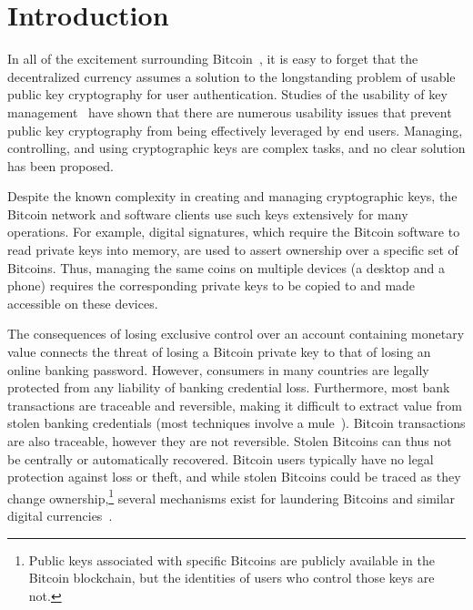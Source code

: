 

\section{Introduction}
In all of the excitement surrounding Bitcoin~\cite{Nak08}, it is easy to forget that the decentralized currency assumes a solution to the longstanding problem of usable public key cryptography for user authentication. Studies of the usability of key management~\cite{GM05,GMSN+05,SBKH06,GFF06} have shown that there are numerous usability issues that prevent public key cryptography from being effectively leveraged by end users. Managing, controlling, and using cryptographic keys are complex tasks, and no clear solution has been proposed.  

Despite the known complexity in creating and managing cryptographic keys, the Bitcoin network and software clients use such keys extensively for many operations. For example, digital signatures, which require the Bitcoin software to read private keys into memory, are used to assert ownership over a specific set of Bitcoins. Thus, managing the same coins on multiple devices (\eg a desktop and a phone) requires the corresponding private keys to be copied to and made accessible on these devices. 


The consequences of losing exclusive control over an account containing monetary value connects the threat of losing a Bitcoin private key to that of losing an online banking password. However, consumers in many countries are legally protected from any liability of banking credential loss. Furthermore, most bank transactions are traceable and reversible, making it difficult to extract value from stolen banking credentials (most techniques involve a mule~\cite{FH12}). Bitcoin transactions are also traceable, however they are not reversible. Stolen Bitcoins can thus not be centrally or automatically recovered. Bitcoin users typically have no legal protection against loss or theft, and while stolen Bitcoins could be traced as they change ownership,\footnote{Public keys associated with specific Bitcoins are publicly available in the Bitcoin blockchain, but the identities of users who control those keys are not.} several mechanisms exist for laundering Bitcoins and similar digital currencies~\cite{MGGR13,BNMC+14}.

